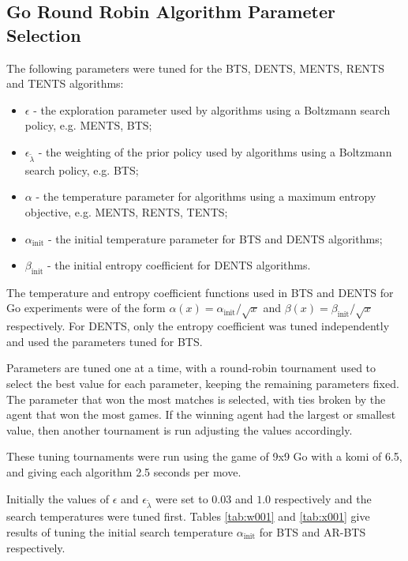 \subsection{Go Round Robin Algorithm Parameter Selection}
\label{appsec:round_robin}

    The following parameters were tuned for the BTS, DENTS, MENTS, RENTS and TENTS algorithms:
    \begin{itemize}
        \item $\epsilon$ - the exploration parameter used by algorithms using a Boltzmann search policy, e.g. MENTS, BTS;
        \item $\epsilon_{\tilde{\lambda}}$ - the weighting of the prior policy used by algorithms using a Boltzmann search policy, e.g. BTS;
        \item $\alpha$ - the temperature parameter for algorithms using a maximum entropy objective, e.g. MENTS, RENTS, TENTS;
        \item $\alpha_{\text{init}}$ - the initial temperature parameter for BTS and DENTS algorithms;
        \item $\beta_{\text{init}}$ - the initial entropy coefficient for DENTS algorithms. 
    \end{itemize}

    The temperature and entropy coefficient functions used in BTS and DENTS for Go experiments were of the form $\alpha(x)=\alpha_{\text{init}}/\sqrt{x}$ and $\beta(x)=\beta_{\text{init}}/\sqrt{x}$ respectively. For DENTS, only the entropy coefficient was tuned independently and used the parameters tuned for BTS.
    
    Parameters are tuned one at a time, with a round-robin tournament used to select the best value for each parameter, keeping the remaining parameters fixed. The parameter that won the most matches is selected, with ties broken by the agent that won the most games. If the winning agent had the largest or smallest value, then another tournament is run adjusting the values accordingly.

    These tuning tournaments were run using the game of 9x9 Go with a komi of 6.5, and giving each algorithm 2.5 seconds per move. 

    Initially the values of $\epsilon$ and $\epsilon_{\tilde{\lambda}}$ were set to $0.03$ and $1.0$ respectively and the search temperatures were tuned first. Tables \ref{tab:w001} and \ref{tab:x001} give results of tuning the initial search temperature $\alpha_{\text{init}}$ for BTS and AR-BTS respectively. 
    
